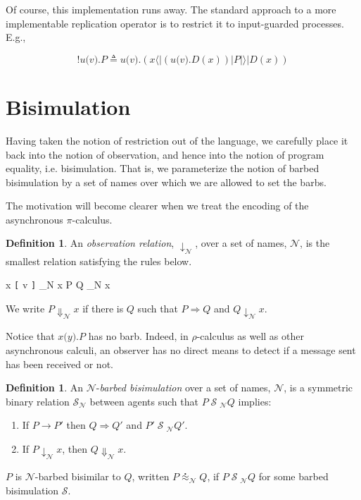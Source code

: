 \documentclass[]{amsart}
\newcommand{\lliftb}{\langle\!|}
\newcommand{\rliftb}{|\!\rangle}
\newcommand{\id}[1]{\texttt{#1}}
\newcommand{\juxtap}{\mathbin{\id{|}}}
\newcommand{\concat}{\mathbin{\id{.}}}
\newcommand{\nameeq}{\mathbin{\equiv_N}}
\newcommand{\binpar}[2]{#1 \juxtap #2}
\newcommand{\outputp}[2]{#1 \id{[} #2 \id{]}}
\newcommand{\prefix}[3]{#1 \id{(} #2 \id{)} \concat #3}
\newcommand{\lift}[2]{#1 \lliftb #2 \rliftb}
\newcommand{\bangp}[1]{\id{!} #1}
\newcommand{\red}{\rightarrow}
\newcommand{\wred}{\Rightarrow}
\newcommand{\rel}[1]{\;{\mathcal #1}\;} %
\newcommand{\wbbisim}{\stackrel{\centerdot}{\approx}} %
\theoremstyle{definition}
\newtheorem{defn}[thm]{Definition}
\theoremstyle{remark}
\numberwithin{equation}{subsection}
\newcommand{\pic}{$\pi$-calculus}
\newcommand{\rhoc}{$\rho$-calculus}
\begin{document}
Of course, this implementation runs away. The standard approach to a
more implementable replication operator is to restrict it to
input-guarded processes. E.g.,

\begin{equation*}
\bangp{\prefix{u}{v}{P}} 
	\triangleq 
	\prefix{u}{v}{(\binpar{\lift{x}{\binpar{(\prefix{u}{v}{D(x)})}{P}}}{D(x)})}
\end{equation*}

\section{Bisimulation}

Having taken the notion of restriction out of the language, we
carefully place it back into the notion of observation, and hence into
the notion of program equality, i.e. bisimulation. That is, we
parameterize the notion of barbed bisimulation by a set of names over
which we are allowed to set the barbs. 


The motivation will become clearer when we treat the encoding of the
asynchronous {\pic}.

\begin{defn}
An \emph{observation relation}, $\downarrow_{\mathcal N}$, over a set
of names, $\mathcal N$, is the smallest relation satisfying the rules
below.

\infrule[Out-barb]{y \in {\mathcal N}, \; x \nameeq y}
		  {\outputp{x}{v} \downarrow_{\mathcal N} x}
		  {\binpar{P}{Q} \downarrow_{\mathcal N} x}

We write $P \Downarrow_{\mathcal N} x$ if there is $Q$ such that 
$P \wred Q$ and $Q \downarrow_{\mathcal N} x$.
\end{defn}

Notice that $\prefix{x}{y}{P}$ has no barb.  Indeed, in {\rhoc} as well
as other asynchronous calculi, an observer has no direct means to
detect if a message sent has been received or not.

\begin{defn}
An  ${\mathcal N}$-\emph{barbed bisimulation} over a set of names, ${\mathcal N}$, is a symmetric binary relation 
${\mathcal S}_{\mathcal N}$ between agents such that $P\rel{S}_{\mathcal N}Q$ implies:
\begin{enumerate}
\item If $P \red P'$ then $Q \wred Q'$ and $P'\rel{S}_{\mathcal N} Q'$.
\item If $P\downarrow_{\mathcal N} x$, then $Q\Downarrow_{\mathcal N} x$.
\end{enumerate}
$P$ is ${\mathcal N}$-barbed bisimilar to $Q$, written
$P \wbbisim_{\mathcal N} Q$, if $P \rel{S}_{\mathcal N} Q$ for some barbed bisimulation $\mathcal S$.
\end{defn}
\end{document}
